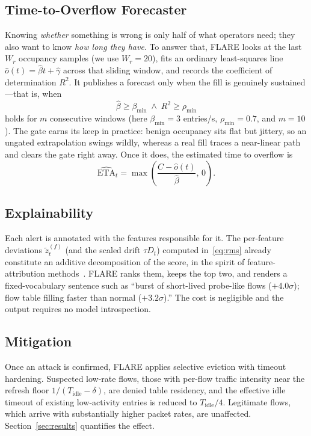 \documentclass[conference]{IEEEtran}
\begin{document}
\subsection{Time-to-Overflow Forecaster}
Knowing \emph{whether} something is wrong is only half of what operators need;
they also want to know \emph{how long they have}. To answer that, FLARE looks
at the last $W_r$ occupancy samples (we use $W_r = 20$), fits an ordinary
least-squares line $\hat o(t) = \hat\beta t + \hat\gamma$ across that sliding
window, and records the coefficient of determination $R^2$. It publishes a
forecast only when the fill is genuinely sustained---that is, when
\begin{equation}
\hat\beta \ge \beta_{\min}
\;\wedge\;
R^2 \ge \rho_{\min}
\label{eq:gate}
\end{equation}
holds for $m$ consecutive windows (here $\beta_{\min} = 3$ entries/s,
$\rho_{\min} = 0.7$, and $m = 10$). The gate earns its keep in practice: benign
occupancy sits flat but jittery, so an ungated extrapolation swings wildly,
whereas a real fill traces a near-linear path and clears the gate right away.
Once it does, the estimated time to overflow is
\begin{equation}
\widehat{\mathrm{ETA}}_t = \max\!\left(\frac{C - \hat o(t)}{\hat\beta},\, 0\right).
\label{eq:eta}
\end{equation}

\subsection{Explainability}
Each alert is annotated with the features responsible for it. The per-feature
deviations $\tilde z_t^{(f)}$ (and the scaled drift $\tau D_t$) computed
in~\eqref{eq:rms} already constitute an additive decomposition of the score, in
the spirit of feature-attribution methods~\cite{lundberg2017shap}. FLARE ranks
them, keeps the top two, and renders a fixed-vocabulary sentence such as
``burst of short-lived probe-like flows ($+4.0\sigma$); flow table filling
faster than normal ($+3.2\sigma$).'' The cost is negligible and the output
requires no model introspection.

\subsection{Mitigation}
Once an attack is confirmed, FLARE applies selective eviction with timeout
hardening. Suspected low-rate flows, those with per-flow traffic intensity near
the refresh floor $1/(T_{\mathrm{idle}}-\delta)$, are denied table residency,
and the effective idle timeout of existing low-activity entries is reduced to
$T_{\mathrm{idle}}/4$. Legitimate flows, which arrive with substantially higher
packet rates, are unaffected. Section~\ref{sec:results} quantifies the effect.
\end{document}
